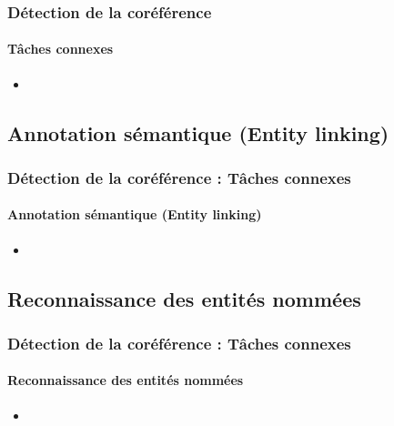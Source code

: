 \documentclass[xcolor=table]{beamer}
\begin{document}
\begin{frame}
	\frametitle{Détection de la coréférence}
	\framesubtitle{Tâches connexes}
	
	\begin{itemize}
		\item 
	\end{itemize}
	
\end{frame}

\subsection{Annotation sémantique (Entity linking)}

\begin{frame}
	\frametitle{Détection de la coréférence : Tâches connexes}
	\framesubtitle{Annotation sémantique (Entity linking)}
	
	\begin{itemize}
		\item 
	\end{itemize}
	
\end{frame}

\subsection{Reconnaissance des entités nommées}

\begin{frame}
	\frametitle{Détection de la coréférence : Tâches connexes}
	\framesubtitle{Reconnaissance des entités nommées}
	
	\begin{itemize}
		\item 
	\end{itemize}
	
\end{frame}


\end{document}
